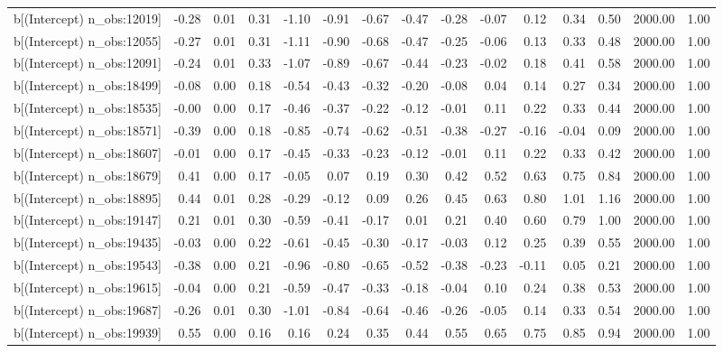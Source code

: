 \begin{table}[ht]
\begin{tabular}{rrrrrrrrrrrrrrr}
  b[(Intercept) n\_obs:12019] & -0.28 & 0.01 & 0.31 & -1.10 & -0.91 & -0.67 & -0.47 & -0.28 & -0.07 & 0.12 & 0.34 & 0.50 & 2000.00 & 1.00 \\ 
  b[(Intercept) n\_obs:12055] & -0.27 & 0.01 & 0.31 & -1.11 & -0.90 & -0.68 & -0.47 & -0.25 & -0.06 & 0.13 & 0.33 & 0.48 & 2000.00 & 1.00 \\ 
  b[(Intercept) n\_obs:12091] & -0.24 & 0.01 & 0.33 & -1.07 & -0.89 & -0.67 & -0.44 & -0.23 & -0.02 & 0.18 & 0.41 & 0.58 & 2000.00 & 1.00 \\ 
  b[(Intercept) n\_obs:18499] & -0.08 & 0.00 & 0.18 & -0.54 & -0.43 & -0.32 & -0.20 & -0.08 & 0.04 & 0.14 & 0.27 & 0.34 & 2000.00 & 1.00 \\ 
  b[(Intercept) n\_obs:18535] & -0.00 & 0.00 & 0.17 & -0.46 & -0.37 & -0.22 & -0.12 & -0.01 & 0.11 & 0.22 & 0.33 & 0.44 & 2000.00 & 1.00 \\ 
  b[(Intercept) n\_obs:18571] & -0.39 & 0.00 & 0.18 & -0.85 & -0.74 & -0.62 & -0.51 & -0.38 & -0.27 & -0.16 & -0.04 & 0.09 & 2000.00 & 1.00 \\ 
  b[(Intercept) n\_obs:18607] & -0.01 & 0.00 & 0.17 & -0.45 & -0.33 & -0.23 & -0.12 & -0.01 & 0.11 & 0.22 & 0.33 & 0.42 & 2000.00 & 1.00 \\ 
  b[(Intercept) n\_obs:18679] & 0.41 & 0.00 & 0.17 & -0.05 & 0.07 & 0.19 & 0.30 & 0.42 & 0.52 & 0.63 & 0.75 & 0.84 & 2000.00 & 1.00 \\ 
  b[(Intercept) n\_obs:18895] & 0.44 & 0.01 & 0.28 & -0.29 & -0.12 & 0.09 & 0.26 & 0.45 & 0.63 & 0.80 & 1.01 & 1.16 & 2000.00 & 1.00 \\ 
  b[(Intercept) n\_obs:19147] & 0.21 & 0.01 & 0.30 & -0.59 & -0.41 & -0.17 & 0.01 & 0.21 & 0.40 & 0.60 & 0.79 & 1.00 & 2000.00 & 1.00 \\ 
  b[(Intercept) n\_obs:19435] & -0.03 & 0.00 & 0.22 & -0.61 & -0.45 & -0.30 & -0.17 & -0.03 & 0.12 & 0.25 & 0.39 & 0.55 & 2000.00 & 1.00 \\ 
  b[(Intercept) n\_obs:19543] & -0.38 & 0.00 & 0.21 & -0.96 & -0.80 & -0.65 & -0.52 & -0.38 & -0.23 & -0.11 & 0.05 & 0.21 & 2000.00 & 1.00 \\ 
  b[(Intercept) n\_obs:19615] & -0.04 & 0.00 & 0.21 & -0.59 & -0.47 & -0.33 & -0.18 & -0.04 & 0.10 & 0.24 & 0.38 & 0.53 & 2000.00 & 1.00 \\ 
  b[(Intercept) n\_obs:19687] & -0.26 & 0.01 & 0.30 & -1.01 & -0.84 & -0.64 & -0.46 & -0.26 & -0.05 & 0.14 & 0.33 & 0.54 & 2000.00 & 1.00 \\ 
  b[(Intercept) n\_obs:19939] & 0.55 & 0.00 & 0.16 & 0.16 & 0.24 & 0.35 & 0.44 & 0.55 & 0.65 & 0.75 & 0.85 & 0.94 & 2000.00 & 1.00 \\ 

\end{tabular}
\end{table}
